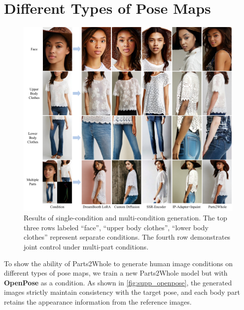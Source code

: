 \section{Different Types of Pose Maps}

\begin{figure}[h]
    \centering
    \includegraphics[width=1\textwidth]{figure/supp_existing_work.pdf}
    \caption{Results of single-condition and multi-condition generation. The top three rows labeled ``face'', ``upper body clothes'', ``lower body clothes'' represent separate conditions. The fourth row demonstrates joint control under multi-part conditions.}
    \label{fig:existing_methods}
\end{figure}

To show the ability of Parts2Whole to generate human image conditions on different types of pose maps, we train a new Parts2Whole model but with \textbf{OpenPose} as a condition. As shown in \cref{fig:supp_openpose}, the generated images strictly maintain consistency with the target pose, and each body part retains the appearance information from the reference images.







